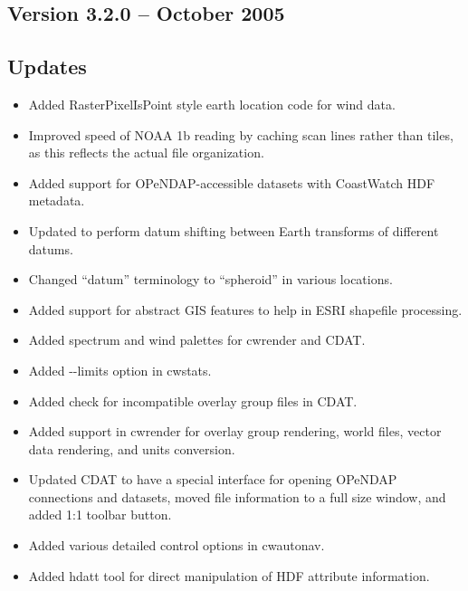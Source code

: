 \subsection*{Version 3.2.0 -- October 2005}

\subsection*{Updates}
\begin{itemize}

  \item Added RasterPixelIsPoint style earth location code for wind
  data.

  \item Improved speed of NOAA 1b reading by caching scan lines rather
  than tiles, as this reflects the actual file organization.

  \item Added support for OPeNDAP-accessible datasets with CoastWatch
  HDF metadata.

  \item Updated to perform datum shifting between Earth
  transforms of different datums.

  \item Changed ``datum'' terminology to ``spheroid'' in various
  locations.

  \item Added support for abstract GIS features to help in ESRI
  shapefile processing.

  \item Added spectrum and wind palettes for cwrender and CDAT.

  \item Added -{-}limits option in cwstats.

  \item Added check for incompatible overlay group files in CDAT.

  \item Added support in cwrender for overlay group rendering, world
  files, vector data rendering, and units conversion.

  \item Updated CDAT to have a special interface for opening OPeNDAP
  connections and datasets, moved file information to a full size
  window, and added 1:1 toolbar button.

  \item Added various detailed control options in cwautonav.

  \item Added hdatt tool for direct manipulation of HDF attribute
  information.

\end{itemize}

